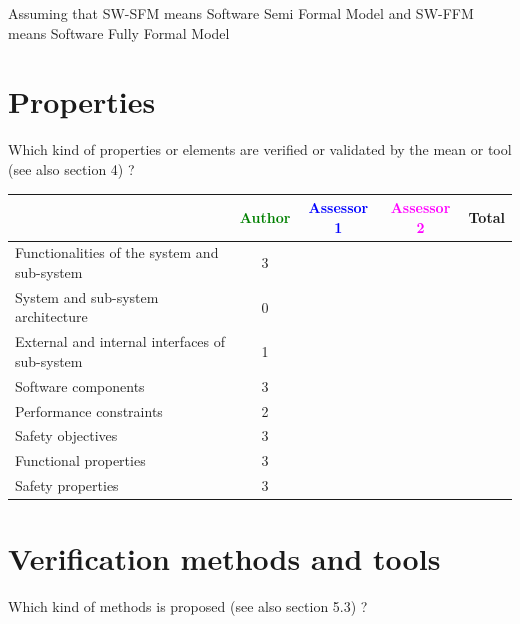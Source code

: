 \begin{author_comment}
	Assuming that SW-SFM means Software Semi Formal Model and SW-FFM means Software Fully Formal Model
\end{author_comment}

\section{Properties}

Which kind of properties or elements are verified or validated by the mean or tool (see also \citep{D4.1} section 4)  ?



\begin{tabular}{|l | c | c | c | c|}
\hline
& \textcolor{green}{Author} & \textcolor{blue}{Assessor 1} & \textcolor{magenta}{Assessor 2} & Total \\
\hline 
Functionalities of the system and sub-system & 3 & & &  \\
\hline
System and sub-system architecture & 0 & & &  \\
\hline
External and internal interfaces of sub-system & 1 & & &  \\
\hline
Software components & 3 & & &  \\
\hline
Performance constraints & 2 & & &  \\
\hline
Safety objectives & 3 & & &  \\
\hline
Functional properties & 3 & & &  \\
\hline
Safety properties & 3 & & &  \\
\hline
\end{tabular}



\section{Verification methods and tools}

Which kind of methods is proposed (see also \citep{D4.1} section 5.3) ?



